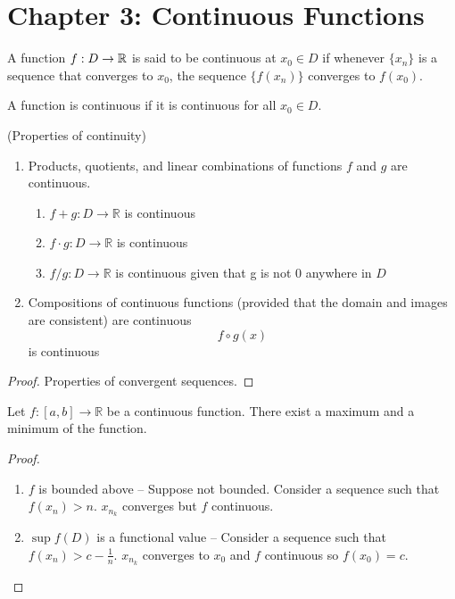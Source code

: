 \documentclass{article}
\begin{document}
\section{Chapter 3: Continuous Functions}

\begin{definition}
    A function $f:D\rightarrow \mathbb{R}$ is said to be continuous at $x_0\in D$ if whenever
    $\{x_n\}$ is a sequence that converges to $x_0$, the sequence $\{f(x_n)\}$ converges
    to $f(x_0)$.

    A function is continuous if it is continuous for all $x_0\in D$.
\end{definition}

\begin{theorem} (Properties of continuity)
    \begin{enumerate}
        \item Products, quotients, and linear combinations of functions $f$ and $g$ are continuous.
        \begin{enumerate}
            \item $f+g:D\rightarrow \mathbb{R}$ is continuous
            \item $f\cdot g:D\rightarrow \mathbb{R}$ is continuous
            \item $f/g:D\rightarrow \mathbb{R}$ is continuous given that g is
            not 0 anywhere in $D$
        \end{enumerate}
        \item Compositions of continuous functions (provided that the domain and images are 
        consistent) are continuous
        \[f\circ g (x)\] is continuous
    \end{enumerate}
\end{theorem}

\begin{proof}
    Properties of convergent sequences.
\end{proof}

\begin{theorem}
    Let $f:[a,b]\rightarrow \mathbb{R}$ be a continuous function. There exist
    a maximum and a minimum of the function.
\end{theorem}

\begin{proof}
    \hfill
    \begin{enumerate}
        \item $f$ is bounded above -- Suppose not bounded. Consider
        a sequence such that $f(x_n) > n$. $x_{n_k}$ converges but
        $f$ continuous.
        \item $\sup f(D)$ is a functional value -- Consider a sequence
        such that $f(x_n) > c-\frac{1}{n}$. $x_{n_k}$ converges to 
        $x_0$ and $f$ continuous so $f(x_0) = c$.
    \end{enumerate}
\end{proof}
\end{document}
